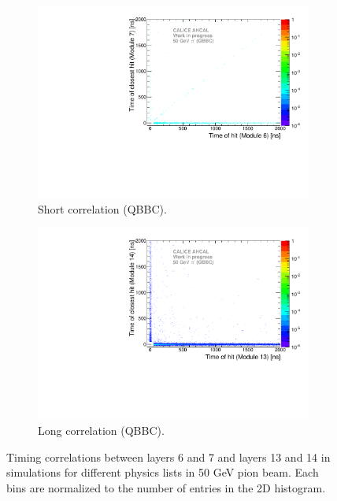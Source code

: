 \begin{figure}[htbp!]
\begin{subfigure}[t]{0.49\textwidth}
    \centering
    \includegraphics[width=1\textwidth]{../Thesis_Plots/Timing/Pions/Plots/ComparisonToSim/Time_Correlation_50GeV_short_QBBC_DD4hep.pdf}
    \caption{Short correlation (QBBC).} \label{fig:Corr_short_QBBC_DD4hep}
  \end{subfigure}
  \hfill
  \begin{subfigure}[t]{0.49\textwidth}
    \centering
    \includegraphics[width=1\textwidth]{../Thesis_Plots/Timing/Pions/Plots/ComparisonToSim/Time_Correlation_50GeV_long_QBBC_DD4hep.pdf}
    \caption{Long correlation (QBBC).} \label{fig:Corr_long_QBBC_DD4hep}
  \end{subfigure}
  \caption{Timing correlations between layers 6 and 7 and layers 13 and 14 in \ddhep simulations for different physics lists in 50 GeV pion beam. Each bins are normalized to the number of entries in the 2D histogram.}
\end{figure}
